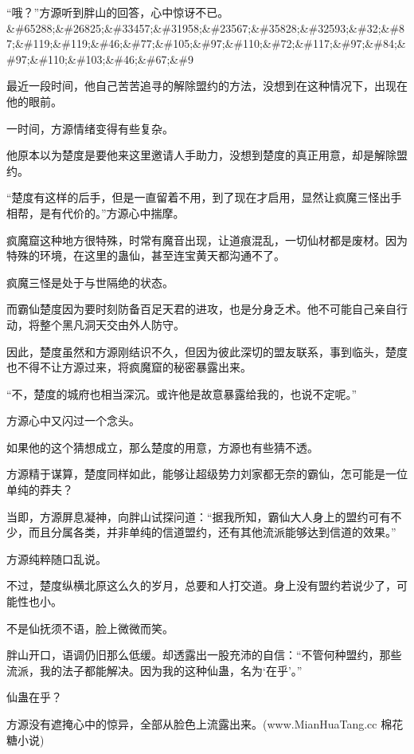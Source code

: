 
\begin{this_body}

“哦？”方源听到胖山的回答，心中惊讶不已。\&\#65288;\&\#26825;\&\#33457;\&\#31958;\&\#23567;\&\#35828;\&\#32593;\&\#32;\&\#87;\&\#119;\&\#119;\&\#46;\&\#77;\&\#105;\&\#97;\&\#110;\&\#72;\&\#117;\&\#97;\&\#84;\&\#97;\&\#110;\&\#103;\&\#46;\&\#67;\&\#9

最近一段时间，他自己苦苦追寻的解除盟约的方法，没想到在这种情况下，出现在他的眼前。

一时间，方源情绪变得有些复杂。

他原本以为楚度是要他来这里邀请人手助力，没想到楚度的真正用意，却是解除盟约。

“楚度有这样的后手，但是一直留着不用，到了现在才启用，显然让疯魔三怪出手相帮，是有代价的。”方源心中揣摩。

疯魔窟这种地方很特殊，时常有魔音出现，让道痕混乱，一切仙材都是废材。因为特殊的环境，在这里的蛊仙，甚至连宝黄天都沟通不了。

疯魔三怪是处于与世隔绝的状态。

而霸仙楚度因为要时刻防备百足天君的进攻，也是分身乏术。他不可能自己亲自行动，将整个黑凡洞天交由外人防守。

因此，楚度虽然和方源刚结识不久，但因为彼此深切的盟友联系，事到临头，楚度也不得不让方源过来，将疯魔窟的秘密暴露出来。

“不，楚度的城府也相当深沉。或许他是故意暴露给我的，也说不定呢。”

方源心中又闪过一个念头。

如果他的这个猜想成立，那么楚度的用意，方源也有些猜不透。

方源精于谋算，楚度同样如此，能够让超级势力刘家都无奈的霸仙，怎可能是一位单纯的莽夫？

当即，方源屏息凝神，向胖山试探问道：“据我所知，霸仙大人身上的盟约可有不少，而且分属各类，并非单纯的信道盟约，还有其他流派能够达到信道的效果。”

方源纯粹随口乱说。

不过，楚度纵横北原这么久的岁月，总要和人打交道。身上没有盟约若说少了，可能性也小。

不是仙抚须不语，脸上微微而笑。

胖山开口，语调仍旧那么低缓。却透露出一股充沛的自信：“不管何种盟约，那些流派，我的法子都能解决。因为我的这种仙蛊，名为‘在乎’。”

仙蛊在乎？

方源没有遮掩心中的惊异，全部从脸色上流露出来。(www.MianHuaTang.cc 棉花糖小说)


\end{this_body}
